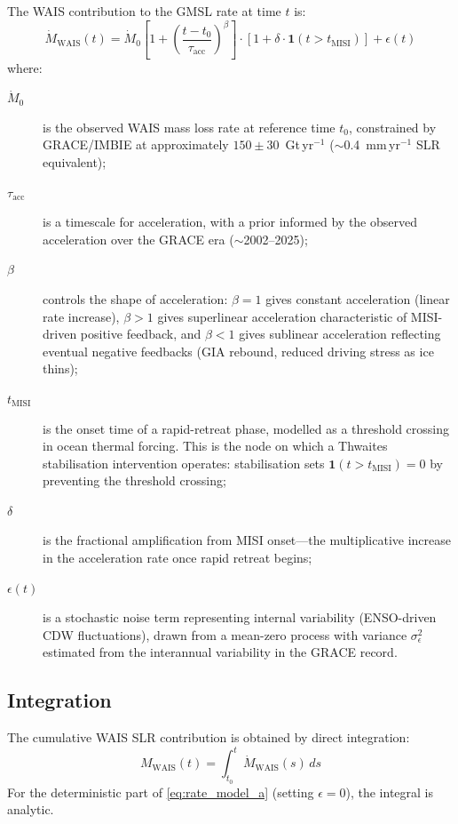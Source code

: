 \documentclass[11pt]{article}
\newcommand{\Ind}{\mathbf{1}}
\newcommand{\WAIS}{\text{WAIS}}
\newcommand{\MISI}{\text{MISI}}
\begin{document}
The WAIS contribution to the GMSL rate at time $t$ is:
\begin{equation}
  \dot{M}_{\WAIS}(t) = \dot{M}_0 \left[1 + \left(\frac{t - t_0}{\tau_{\text{acc}}}\right)^{\!\beta}\right]
    \cdot \left[1 + \delta \cdot \Ind\!\left(t > t_{\MISI}\right)\right]
    + \epsilon(t)
  \label{eq:rate_model_a}
\end{equation}
where:
\begin{description}
  \item[$\dot{M}_0$] is the observed WAIS mass loss rate at reference time $t_0$, constrained by GRACE/IMBIE at approximately $150 \pm 30$~Gt\,yr$^{-1}$ ($\sim$0.4~mm\,yr$^{-1}$ SLR equivalent);

  \item[$\tau_{\text{acc}}$] is a timescale for acceleration, with a prior informed by the observed acceleration over the GRACE era ($\sim$2002--2025);

  \item[$\beta$] controls the shape of acceleration: $\beta = 1$ gives constant acceleration (linear rate increase), $\beta > 1$ gives superlinear acceleration characteristic of MISI-driven positive feedback, and $\beta < 1$ gives sublinear acceleration reflecting eventual negative feedbacks (GIA rebound, reduced driving stress as ice thins);

  \item[$t_{\MISI}$] is the onset time of a rapid-retreat phase, modelled as a threshold crossing in ocean thermal forcing.  This is the node on which a Thwaites stabilisation intervention operates: stabilisation sets $\Ind(t > t_{\MISI}) = 0$ by preventing the threshold crossing;

  \item[$\delta$] is the fractional amplification from MISI onset---the multiplicative increase in the acceleration rate once rapid retreat begins;

  \item[$\epsilon(t)$] is a stochastic noise term representing internal variability (ENSO-driven CDW fluctuations), drawn from a mean-zero process with variance $\sigma^2_\epsilon$ estimated from the interannual variability in the GRACE record.
\end{description}

\subsection{Integration}

The cumulative WAIS SLR contribution is obtained by direct integration:
\begin{equation}
  M_{\WAIS}(t) = \int_{t_0}^{t} \dot{M}_{\WAIS}(s)\, ds
  \label{eq:cumulative_a}
\end{equation}
For the deterministic part of \cref{eq:rate_model_a} (setting $\epsilon = 0$), the integral is analytic.
\end{document}
